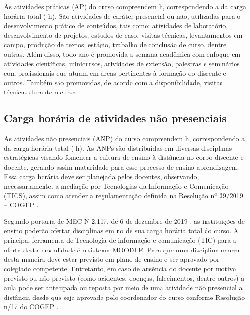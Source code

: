
As atividades práticas (AP) do curso compreendem \the\value{horasAP} h, correspondendo a \percentagem{\the\value{horasAP}}{\the\value{horasT}} da carga horária total (\the\value{horasT} h). São atividades de caráter presencial ou não, utilizadas para o desenvolvimento prático de conteúdos, tais como: atividades de laboratório, desenvolvimento de projetos, estudos de caso, visitas técnicas, levantamentos em campo, produção de textos, estágio, trabalho de conclusão de curso, dentre outras. Além disso, todo ano é promovida a semana acadêmica com enfoque em atividades científicas, minicursos, atividades de extensão, palestras e seminários com profissionais que atuam em áreas pertinentes à formação do discente e outros. Também são promovidas, de acordo com a disponibilidade, visitas técnicas durante o curso.

\subsection{Carga horária de atividades não presenciais}

As atividades não presenciais (ANP) do curso compreendem \the\value{horasANP} h, correspondendo a \percentagem{\the\value{horasANP}}{\the\value{horasT}} da carga horária total (\the\value{horasT} h). As ANPs são distribuídas em diversas disciplinas estratégicas visando fomentar a cultura de ensino à distância no corpo discente e docente, gerando assim maturidade para esse processo de ensino-aprendizagem. Essa carga horária deve ser planejada pelos docentes, observando, necessariamente, a mediação por Tecnologias da Informação e Comunicação (TICS), assim como atender a regulamentação definida na Resolução nº 39/2019 – COGEP \cite{cogep39}. 

Segundo portaria de MEC N\textordmasculine{} 2.117, de 6 de dezembro de 2019 \cite{portaria2117mec}, as instituições de ensino poderão ofertar disciplinas em no  de sua carga horária total do curso. A principal ferramenta de Tecnologia de informação e comunicação (TIC) para a oferta desta modalidade é o sistema MOODLE. Para que uma disciplina ocorra desta maneira deve estar previsto em plano de ensino e ser aprovado por colegiado competente. Entretanto, em caso de ausência do docente por motivo previsto ou não previsto (como acidentes, doenças, falecimentos, dentre outros) a aula pode ser antecipada ou reposta por meio de uma atividade não presencial a distância desde que seja aprovada pelo coordenador do curso conforme Resolução n/17 do COGEP \cite{cogep84}.


